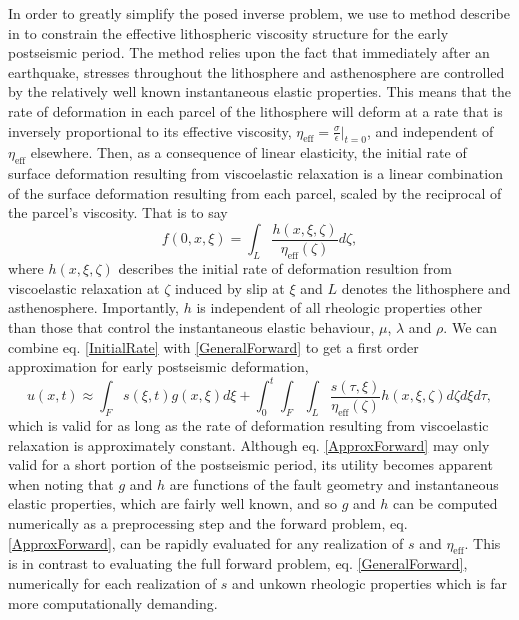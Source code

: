\documentclass[12pt]{article}
\begin{document}
In order to greatly simplify the posed inverse problem, we use to method describe in \cite{Hines2015} to constrain the effective lithospheric viscosity structure for the early postseismic period.  The method relies upon the fact that immediately after an earthquake, stresses throughout the lithosphere and asthenosphere are controlled by the relatively well known instantaneous elastic properties.  This means that the rate of deformation in each parcel of the lithosphere will deform at a rate that is inversely proportional to its effective viscosity, $\eta_{\mathrm{eff}}=\frac{\sigma}{\dot{\epsilon}}|_{t=0}$, and independent of $\eta_{\mathrm{eff}}$ elsewhere. Then, as a consequence of linear elasticity, the initial rate of surface deformation resulting from viscoelastic relaxation is a linear combination of the surface deformation resulting from each parcel, scaled by the reciprocal of the parcel's viscosity. That is to say   
\begin{equation}\label{InitialRate}
  f(0,x,\xi) = \int_L \frac{h(x,\xi,\zeta)}{\eta_\mathrm{eff}(\zeta)} d\zeta, 
\end{equation}
where $h(x,\xi,\zeta)$ describes the initial rate of deformation resultion from viscoelastic relaxation at $\zeta$ induced by slip at $\xi$ and $L$ denotes the lithosphere and asthenosphere. Importantly, $h$ is independent of all rheologic properties other than those that control the instantaneous elastic behaviour, $\mu$, $\lambda$ and $\rho$. We can combine eq. \ref{InitialRate} with \ref{GeneralForward} to get a first order approximation for early postseismic deformation,
\begin{equation}\label{ApproxForward}
  u(x,t) \approx \int_F s(\xi,t)g(x,\xi)d\xi + 
           \int_0^t\int_F\int_L \frac{s(\tau,\xi)}{\eta_\mathrm{eff}(\zeta)} h(x,\xi,\zeta) d\zeta d\xi d\tau,
\end{equation}
which is valid for as long as the rate of deformation resulting from viscoelastic relaxation is approximately constant. Although eq. \ref{ApproxForward} may only valid for a short portion of the postseismic period, its utility becomes apparent when noting that $g$ and $h$ are functions of the fault geometry and instantaneous elastic properties, which are fairly well known, and so $g$ and $h$ can be computed numerically as a preprocessing step and the forward problem, eq. \ref{ApproxForward}, can be rapidly evaluated for any realization of $s$ and $\eta_{\mathrm{eff}}$.  This is in contrast to evaluating the full forward problem, eq. \ref{GeneralForward}, numerically for each realization of $s$ and unkown rheologic properties which is far more computationally demanding.   
\end{document}
